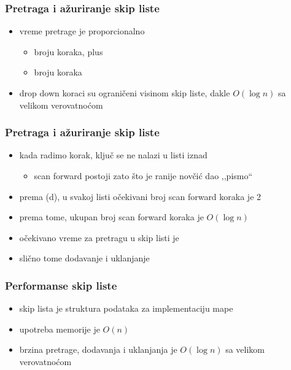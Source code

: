 \documentclass[compress,aspectratio=169]{beamer}
\begin{document}
\begin{frame}[fragile]
  \frametitle{Pretraga i ažuriranje skip liste}
  \begin{itemize}
    \item vreme pretrage je proporcionalno
    \begin{itemize}
      \item broju  koraka, plus
      \item broju  koraka
    \end{itemize}
    \item drop down koraci su ograničeni visinom skip liste, dakle $O(\log n)$ sa velikom verovatnoćom
  \end{itemize}
\end{frame}

\begin{frame}[fragile]
  \frametitle{Pretraga i ažuriranje skip liste}
  \begin{itemize}
    \item kada radimo  korak, ključ se ne nalazi u listi iznad
    \begin{itemize}
      \item scan forward postoji zato što je ranije novčić dao ,,pismo``
    \end{itemize}
    \item prema (d), u svakoj listi očekivani broj scan forward koraka je 2
    \item prema tome, ukupan broj scan forward koraka je $O(\log n)$
    \item očekivano vreme za pretragu u skip listi je 
    \item slično tome dodavanje i uklanjanje
  \end{itemize}
\end{frame}

\begin{frame}[fragile]
  \frametitle{Performanse skip liste}
  \begin{itemize}
    \item skip lista je struktura podataka za implementaciju mape
    \item upotreba memorije je $O(n)$
    \item brzina pretrage, dodavanja i uklanjanja je $O(\log n)$ sa velikom verovatnoćom
  \end{itemize}
\end{frame}
\end{document}
